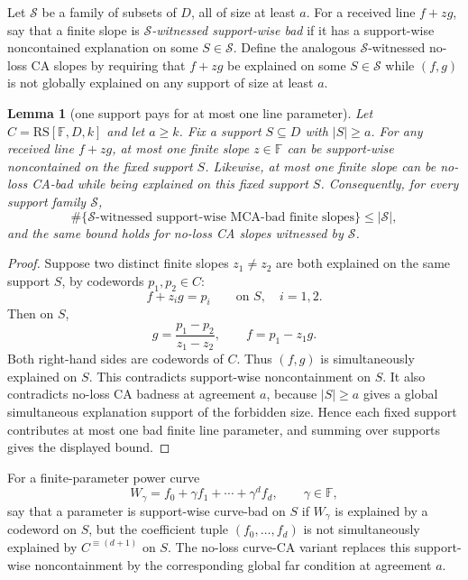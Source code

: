 \documentclass[11pt]{article}
\newtheorem{lemma}[theorem]{Lemma}
\theoremstyle{definition}
\theoremstyle{remark}
\newcommand{\F}{\mathbb{F}}
\newcommand{\RS}{\mathrm{RS}}
\begin{document}
Let $\mathcal S$ be a family of subsets of $D$, all of size at least $a$.  For a
received line $f+zg$, say that a finite slope is
\emph{$\mathcal S$-witnessed support-wise bad} if it has a support-wise
noncontained explanation on some $S\in\mathcal S$.  Define the analogous
$\mathcal S$-witnessed no-loss CA slopes by requiring that $f+zg$ be explained
on some $S\in\mathcal S$ while $(f,g)$ is not globally explained on any support
of size at least $a$.

\begin{lemma}[one support pays for at most one line parameter]
\label{lem:one-support-one-line}
Let $C=\RS[\F,D,k]$ and let $a\ge k$.  Fix a support
$S\subseteq D$ with $|S|\ge a$.  For any received line $f+zg$, at most one finite
slope $z\in\F$ can be support-wise noncontained on the fixed support $S$.
Likewise, at most one finite slope can be no-loss CA-bad while being explained on
this fixed support $S$.  Consequently, for every support family $\mathcal S$,
\[
        \#\{\mathcal S\text{-witnessed support-wise MCA-bad finite slopes}\}
        \le |\mathcal S|,
\]
and the same bound holds for no-loss CA slopes witnessed by $\mathcal S$.
\end{lemma}

\begin{proof}
Suppose two distinct finite slopes $z_1\ne z_2$ are both explained on the same
support $S$, by codewords $p_1,p_2\in C$:
\[
        f+z_i g=p_i\qquad\text{on }S,\quad i=1,2.
\]
Then on $S$,
\[
        g=\frac{p_1-p_2}{z_1-z_2},\qquad
        f=p_1-z_1g.
\]
Both right-hand sides are codewords of $C$.  Thus $(f,g)$ is simultaneously
explained on $S$.  This contradicts support-wise noncontainment on $S$.  It also
contradicts no-loss CA badness at agreement $a$, because $|S|\ge a$ gives a
global simultaneous explanation support of the forbidden size.  Hence each fixed
support contributes at most one bad finite line parameter, and summing over
supports gives the displayed bound.
\end{proof}

For a finite-parameter power curve
\[
        W_\gamma=f_0+\gamma f_1+\cdots+\gamma^d f_d,
        \qquad \gamma\in\F,
\]
say that a parameter is support-wise curve-bad on $S$ if $W_\gamma$ is explained
by a codeword on $S$, but the coefficient tuple $(f_0,\ldots,f_d)$ is not
simultaneously explained by $C^{\equiv(d+1)}$ on $S$.  The no-loss curve-CA
variant replaces this support-wise noncontainment by the corresponding global
far condition at agreement $a$.
\end{document}
